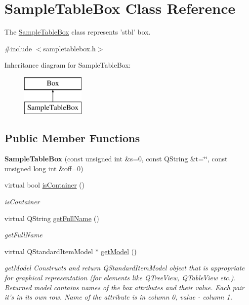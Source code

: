 \hypertarget{class_sample_table_box}{\section{Sample\-Table\-Box Class Reference}
\label{class_sample_table_box}
}


The \hyperlink{class_sample_table_box}{Sample\-Table\-Box} class represents 'stbl' box.  




{\ttfamily \#include $<$sampletablebox.\-h$>$}

Inheritance diagram for Sample\-Table\-Box\-:\begin{figure}[H]
\begin{center}
\leavevmode
\includegraphics[height=2.000000cm]{class_sample_table_box}
\end{center}
\end{figure}
\subsection*{Public Member Functions}
\begin{DoxyCompactItemize}
\item 
\hypertarget{class_sample_table_box_a614be17927e05fb497c948876c62b37e}{{\bfseries Sample\-Table\-Box} (const unsigned int \&s=0, const Q\-String \&t=\char`\"{}\char`\"{}, const unsigned long int \&off=0)}\label{class_sample_table_box_a614be17927e05fb497c948876c62b37e}

\item 
virtual bool \hyperlink{class_sample_table_box_ad104b1eb63f6ce7926bbc7cee83fd29f}{is\-Container} ()
\begin{DoxyCompactList}\small\item\em is\-Container \end{DoxyCompactList}\item 
virtual Q\-String \hyperlink{class_sample_table_box_acdaf2b1d02df4da6fee980f328d24dbb}{get\-Full\-Name} ()
\begin{DoxyCompactList}\small\item\em get\-Full\-Name \end{DoxyCompactList}\item 
virtual Q\-Standard\-Item\-Model $\ast$ \hyperlink{class_sample_table_box_a59a54b04800609fe96e3fbeaeaedfd13}{get\-Model} ()
\begin{DoxyCompactList}\small\item\em get\-Model Constructs and return Q\-Standard\-Item\-Model object that is appropriate for graphical representation (for elements like Q\-Tree\-View, Q\-Table\-View etc.). Returned model contains names of the box attributes and their value. Each pair it's in its own row. Name of the attribute is in column 0, value -\/ column 1. \end{DoxyCompactList}\end{DoxyCompactItemize}
